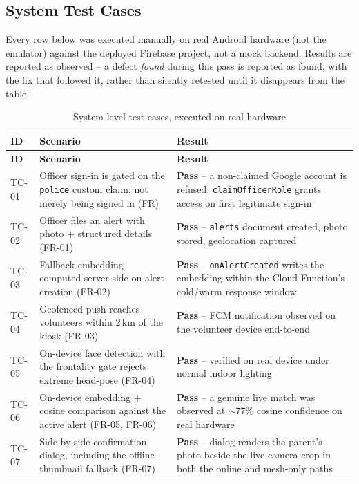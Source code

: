 \documentclass[12pt,a4paper,oneside]{report}
\newcommand{\code}[1]{\texttt{#1}}
\begin{document}
\subsection{System Test Cases}

Every row below was executed manually on real Android hardware (not the
emulator) against the deployed Firebase project, not a mock backend.
Results are reported as observed -- a defect \emph{found} during this pass
is reported as found, with the fix that followed it, rather than silently
retested until it disappears from the table.

\begin{longtable}{|p{1.0cm}|p{5.9cm}|p{5.7cm}|}
\caption{System-level test cases, executed on real hardware}
\label{tab:testcases}\\
\hline
\textbf{ID} & \textbf{Scenario} & \textbf{Result} \\
\hline
\endfirsthead
\hline
\textbf{ID} & \textbf{Scenario} & \textbf{Result} \\
\hline
\endhead
TC-01 & Officer sign-in is gated on the \code{police} custom claim, not merely being signed in (FR) & \textbf{Pass} -- a non-claimed Google account is refused; \code{claimOfficerRole} grants access on first legitimate sign-in \\ \hline
TC-02 & Officer files an alert with photo + structured details (FR-01) & \textbf{Pass} -- \code{alerts} document created, photo stored, geolocation captured \\ \hline
TC-03 & Fallback embedding computed server-side on alert creation (FR-02) & \textbf{Pass} -- \code{onAlertCreated} writes the embedding within the Cloud Function's cold/warm response window \\ \hline
TC-04 & Geofenced push reaches volunteers within 2\,km of the kiosk (FR-03) & \textbf{Pass} -- FCM notification observed on the volunteer device end-to-end \\ \hline
TC-05 & On-device face detection with the frontality gate rejects extreme head-pose (FR-04) & \textbf{Pass} -- verified on real device under normal indoor lighting \\ \hline
TC-06 & On-device embedding + cosine comparison against the active alert (FR-05, FR-06) & \textbf{Pass} -- a genuine live match was observed at $\sim$77\% cosine confidence on real hardware \\ \hline
TC-07 & Side-by-side confirmation dialog, including the offline-thumbnail fallback (FR-07) & \textbf{Pass} -- dialog renders the parent's photo beside the live camera crop in both the online and mesh-only paths \\ \hline

\end{longtable}
\end{document}
